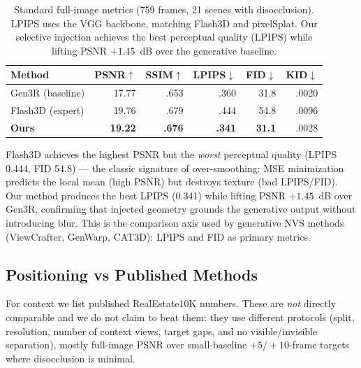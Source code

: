 \documentclass[10pt,twocolumn,letterpaper]{article}
\begin{document}
\begin{table}[t]
\centering\small
\caption{Standard full-image metrics (759 frames, 21 scenes with disocclusion).
LPIPS uses the VGG backbone, matching Flash3D and pixelSplat. Our selective
injection achieves the best perceptual quality (LPIPS) while lifting PSNR
$+1.45$~dB over the generative baseline.}
\begin{tabular}{lrrrrr}
\toprule
Method & PSNR$\uparrow$ & SSIM$\uparrow$ & LPIPS$\downarrow$ & FID$\downarrow$ & KID$\downarrow$ \\
\midrule
Gen3R (baseline) & 17.77 & .653 & .360 & 31.8 & .0020 \\
Flash3D (expert) & 19.76 & .679 & .444 & 54.8 & .0096 \\
\textbf{Ours} & \textbf{19.22} & \textbf{.676} & \textbf{.341} & \textbf{31.1} & .0028 \\
\bottomrule
\end{tabular}
\end{table}
Flash3D achieves the highest PSNR but the \emph{worst} perceptual quality (LPIPS
0.444, FID 54.8) --- the classic signature of over-smoothing: MSE minimization
predicts the local mean (high PSNR) but destroys texture (bad LPIPS/FID). Our
method produces the best LPIPS (0.341) while lifting PSNR $+1.45$~dB over
Gen3R, confirming that injected geometry grounds the generative output without
introducing blur. This is the comparison axis used by generative NVS methods
(ViewCrafter, GenWarp, CAT3D): LPIPS and FID as primary metrics.

\subsection{Positioning vs Published Methods}
\label{sec:positioning}
For context we list published RealEstate10K numbers. These are \emph{not}
directly comparable and we do not claim to beat them: they use different
protocols (split, resolution, number of context views, target gaps, and no
visible/invisible separation), mostly full-image PSNR over small-baseline
$+5/+10$-frame targets where disocclusion is minimal.
\end{document}

